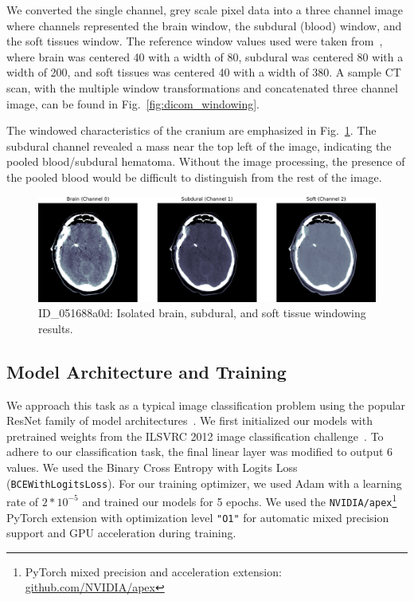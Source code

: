 \documentclass[runningheads]{llncs}
\begin{document}
We converted the single channel, grey scale pixel data into a three channel image where channels represented the brain window, the subdural (blood) window, and the soft tissues window.
The reference window values used were taken from~\cite{radiopaedia/windowing}, where brain was centered 40 with a width of 80, subdural was centered 80 with a width of 200, and soft tissues was centered 40 with a width of 380.
A sample CT scan, with the multiple window transformations and concatenated three channel image, can be found in Fig.~\ref{fig:dicom_windowing}.

The windowed characteristics of the cranium are emphasized in Fig.~\ref{fig:dicom_windowing_breakdown}.
The subdural channel revealed a mass near the top left of the image, indicating the pooled blood/subdural hematoma.
Without the image processing, the presence of the pooled blood would be difficult to distinguish from the rest of the image.

\begin{figure}[htbp]
    \centering
    \includegraphics[width=4.8in]{fig/dicom_channels}
    \caption{ID\_051688a0d: Isolated brain, subdural, and soft tissue windowing results.}
    \label{fig:dicom_windowing_breakdown}
\end{figure}

\subsection{Model Architecture and Training}

We approach this task as a typical image classification problem using the popular ResNet family of model architectures~\cite{He_2016_CVPR}.
We first initialized our models with pretrained weights from the ILSVRC 2012 image classification challenge~\cite{ILSVRC15}.
To adhere to our classification task, the final linear layer was modified to output 6 values.
We used the Binary Cross Entropy with Logits Loss (\texttt{BCEWithLogitsLoss}).
For our training optimizer, we used Adam with a learning rate of $2*10^{-5}$ and trained our models for 5 epochs.
We used the \texttt{NVIDIA/apex}\footnote{PyTorch mixed precision and acceleration extension: \href{https://github.com/NVIDIA/apex}{github.com/NVIDIA/apex}} PyTorch extension with optimization level \texttt{"O1"} for automatic mixed precision support and GPU acceleration during training.
\end{document}
